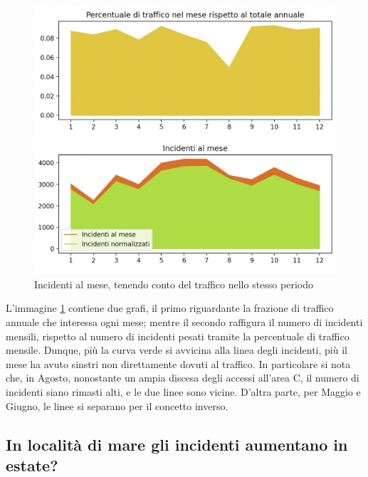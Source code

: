 \documentclass[a4paper]{report}
\begin{document}
\begin{figure}
    \includegraphics[width=\linewidth]{../src/area_c/incidenti_traffico_mese.png}
    \caption{Incidenti al mese, tenendo conto del traffico nello stesso periodo}
    \label{fig:incidenti-traffico-mese}
\end{figure}

L'immagine \ref{fig:incidenti-traffico-mese} contiene due grafi, 
il primo riguardante la frazione di traffico annuale che interessa ogni mese; 
mentre il secondo raffigura il numero di incidenti mensili, rispetto al numero di incidenti pesati 
tramite la percentuale di traffico mensile.
Dunque, più la curva verde si avvicina alla linea degli incidenti, più il mese ha avuto sinstri 
non direttamente dovuti al traffico.
In particolare si nota che, in Agosto, nonostante un ampia discesa degli accessi all'area C, 
il numero di incidenti siano rimasti alti, e le due linee sono vicine.
D'altra parte, per Maggio e Giugno, le linee si separano per il concetto inverso.

\subsection{In località di mare gli incidenti aumentano in estate?}
\end{document}
